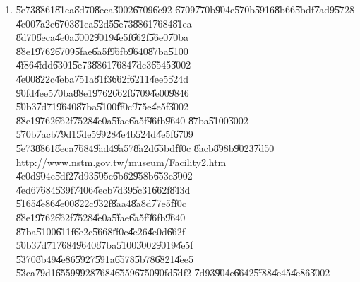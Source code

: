 \documentclass[12pt,a4paper]{article}
\begin{document}
\begin{enumerate}
\item \U{5e73}\U{8861}\U{81ea}\U{8d70}\U{8eca}\U{3002}\U{6709}\U{6c92}%
\U{6709}\U{770b}\U{904e}\U{570b}\U{5916}\U{8b66}\U{5bdf}\U{7ad9}\U{5728}%
\U{4e00}\U{7a2e}\U{6703}\U{81ea}\U{52d5}\U{5e73}\U{8861}\U{7684}\U{81ea}%
\U{8d70}\U{8eca}\U{4e0a}\U{3002}\U{9019}\U{4e5f}\U{662f}\U{56e0}\U{70ba}%
\U{88e1}\U{9762}\U{6709}\U{5fae}\U{6a5f}\U{96fb}\U{9640}\U{87ba}\U{5100}%
\U{4f86}\U{4fdd}\U{6301}\U{5e73}\U{8861}\U{7684}\U{7de3}\U{6545}\U{3002}%
\U{4e00}\U{822c}\U{4eba}\U{751a}\U{81f3}\U{662f}\U{6211}\U{4ee5}\U{524d}%
\U{90fd}\U{4ee5}\U{70ba}\U{88e1}\U{9762}\U{662f}\U{6709}\U{4e00}\U{9846}%
\U{50b3}\U{7d71}\U{9640}\U{87ba}\U{5100}\U{ff0c}\U{975e}\U{4e5f}\U{3002}%
\U{88e1}\U{9762}\U{662f}\U{7528}\U{4e0a}\U{5fae}\U{6a5f}\U{96fb}\U{9640}%
\U{87ba}\U{5100}\U{3002}\newline
\U{570b}\U{7acb}\U{79d1}\U{5de5}\U{9928}\U{4e4b}\U{524d}\U{4e5f}\U{6709}%
\U{5e73}\U{8861}\U{8eca}\U{7684}\U{9ad4}\U{9a57}\U{8a2d}\U{65bd}\U{ff0c}%
\U{8acb}\U{898b}\U{9023}\U{7d50}\newline
http://www.nstm.gov.tw/museum/Facility2.htm\newline
\U{4e0d}\U{904e}\U{5df2}\U{7d93}\U{505c}\U{6b62}\U{958b}\U{653e}\U{3002}%
\U{4ed6}\U{7684}\U{539f}\U{7406}\U{4ecb}\U{7d39}\U{5c31}\U{662f}\U{843d}%
\U{5165}\U{4e86}\U{4e00}\U{822c}\U{932f}\U{8aa4}\U{8a8d}\U{77e5}\U{ff0c}%
\U{88e1}\U{9762}\U{662f}\U{7528}\U{4e0a}\U{5fae}\U{6a5f}\U{96fb}\U{9640}%
\U{87ba}\U{5100}\U{611f}\U{6e2c}\U{5668}\U{ff0c}\U{4e26}\U{4e0d}\U{662f}%
\U{50b3}\U{7d71}\U{7684}\U{9640}\U{87ba}\U{5100}\U{3002}\U{9019}\U{4e5f}%
\U{5370}\U{8b49}\U{4e86}\U{5927}\U{591a}\U{6578}\U{5b78}\U{6821}\U{4ee5}%
\U{53ca}\U{79d1}\U{6559}\U{9928}\U{7684}\U{6559}\U{6750}\U{90fd}\U{5df2}%
\U{7d93}\U{904e}\U{6642}\U{5f88}\U{4e45}\U{4e86}\U{3002}


\end{enumerate}
\end{document}
